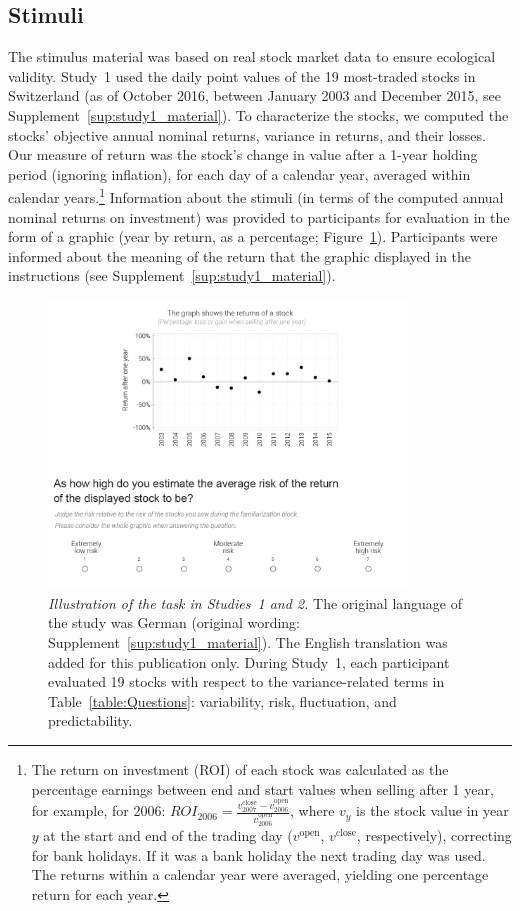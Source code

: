 \documentclass[a4paper,man, natbib,floatsintext]{apa6} %
\begin{document}
\subsection{Stimuli}
The stimulus material was based on real stock market data to ensure ecological validity. Study~1 used the daily point values of the 19 most-traded stocks in Switzerland (as of October 2016, between January 2003 and December 2015, see Supplement~\ref{sup:study1_material}). To characterize the stocks, we computed the stocks' objective annual nominal returns, variance in returns, and their losses. Our  measure of return was the stock's change in value after a 1-year holding period (ignoring inflation), for each day of a calendar year, averaged within calendar years.\footnote{The return on investment (ROI) of each stock was calculated as the percentage earnings between end and start values when selling after 1 year, for example, for 2006: $ROI_{\text{2006}} = \frac{v_{2007}^{\text{close}} - v_{\text{2006}}^{\text{open}}}{v_{\text{2006}}^{\text{open}}}$, where $v_y$ is the stock value in year $y$ at the start and end of the trading day ($v^{\text{open}}$, $v^{\text{close}}$, respectively), correcting for bank holidays. If it was a bank holiday the next trading day was used. The returns within a calendar year were averaged, yielding one percentage return for each year.}
Information about the stimuli (in terms of the computed annual nominal returns on investment) was provided to participants for evaluation in the form of a graphic (year by return, as a percentage; Figure~\ref{fig:study1_material}). Participants were informed about the meaning of the return that the graphic displayed in the instructions (see Supplement~\ref{sup:study1_material}).

\begin{figure}[h!] \centering
    \includegraphics[width=0.85\textwidth]{fig1}
    \caption{\textit{Illustration of the task in Studies~1 and 2.} The original language of the study was German  (original wording: Supplement~\ref{sup:study1_material}). The English translation was added for this publication only. During Study~1, each participant evaluated 19 stocks with respect to the variance-related terms in Table~\ref{table:Questions}: variability, risk, fluctuation, and predictability.}
    \label{fig:study1_material}
\end{figure}
\end{document}
